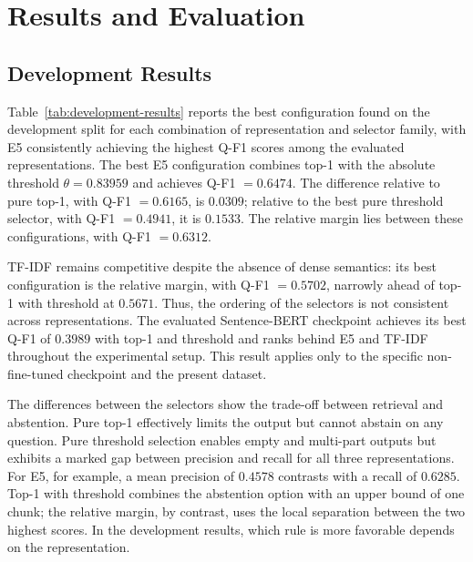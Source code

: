 \documentclass[11pt]{article}
\begin{document}
\section{Results and Evaluation}

\subsection{Development Results}

Table~\ref{tab:development-results} reports the best configuration found on the development split for each combination of representation and selector family, with E5 consistently achieving the highest Q-F1 scores among the evaluated representations. The best E5 configuration combines top-1 with the absolute threshold $\theta=0.83959$ and achieves Q-F1 $=0.6474$. The difference relative to pure top-1, with Q-F1 $=0.6165$, is $0.0309$; relative to the best pure threshold selector, with Q-F1 $=0.4941$, it is $0.1533$. The relative margin lies between these configurations, with Q-F1 $=0.6312$.

TF-IDF remains competitive despite the absence of dense semantics: its best configuration is the relative margin, with Q-F1 $=0.5702$, narrowly ahead of top-1 with threshold at $0.5671$. Thus, the ordering of the selectors is not consistent across representations. The evaluated Sentence-BERT checkpoint achieves its best Q-F1 of $0.3989$ with top-1 and threshold and ranks behind E5 and TF-IDF throughout the experimental setup. This result applies only to the specific non-fine-tuned checkpoint and the present dataset.

The differences between the selectors show the trade-off between retrieval and abstention. Pure top-1 effectively limits the output but cannot abstain on any question. Pure threshold selection enables empty and multi-part outputs but exhibits a marked gap between precision and recall for all three representations. For E5, for example, a mean precision of $0.4578$ contrasts with a recall of $0.6285$. Top-1 with threshold combines the abstention option with an upper bound of one chunk; the relative margin, by contrast, uses the local separation between the two highest scores. In the development results, which rule is more favorable depends on the representation.
\end{document}
